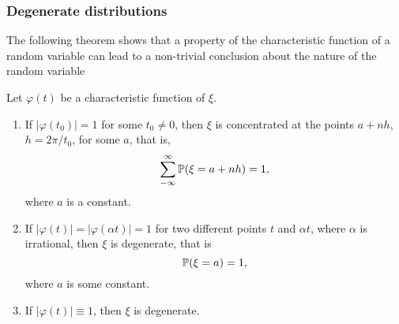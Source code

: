 \subsubsection{Degenerate distributions}
The following theorem shows that a property of the characteristic function of a random variable can lead to a non-trivial conclusion about the nature of the random variable
\begin{theorem}
Let $\varphi(t)$ be a characteristic function of $\xi$.
\begin{enumerate}
    \item If $|\varphi(t_0)| = 1$ for some $t_0 \ne 0$, then $\xi$ is concentrated at the points $a + nh$, $h = 2\pi/t_0$, for some $a$, that is,
    \begin{equation*}
        \sum_{-\infty}^\infty \mathbb{P}(\xi = a + n h) = 1,
    \end{equation*}
    where $a$ is a constant.
    \item If $|\varphi(t)| = |\varphi(\alpha t)| = 1$ for two different points $t$ and $\alpha t$, where $\alpha$ is irrational, then $\xi$ is degenerate, that is 
    \begin{equation*}
        \mathbb{P}(\xi = a) = 1,
    \end{equation*}
    where $a$ is some constant.
    \item If $|\varphi(t)|\equiv 1$, then $\xi$ is degenerate.
\end{enumerate}
\end{theorem}

